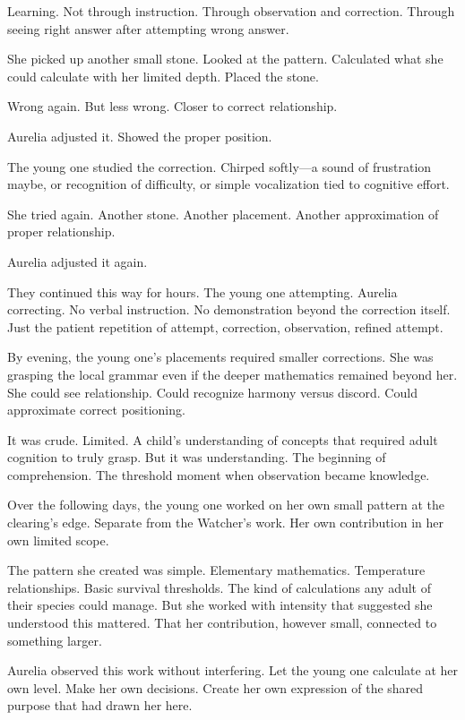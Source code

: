 Learning. Not through instruction. Through observation and correction. Through seeing right answer after attempting wrong answer.

She picked up another small stone. Looked at the pattern. Calculated what she could calculate with her limited depth. Placed the stone.

Wrong again. But less wrong. Closer to correct relationship.

Aurelia adjusted it. Showed the proper position.

The young one studied the correction. Chirped softly—a sound of frustration maybe, or recognition of difficulty, or simple vocalization tied to cognitive effort.

She tried again. Another stone. Another placement. Another approximation of proper relationship.

Aurelia adjusted it again.

They continued this way for hours. The young one attempting. Aurelia correcting. No verbal instruction. No demonstration beyond the correction itself. Just the patient repetition of attempt, correction, observation, refined attempt.

By evening, the young one's placements required smaller corrections. She was grasping the local grammar even if the deeper mathematics remained beyond her. She could see relationship. Could recognize harmony versus discord. Could approximate correct positioning.

It was crude. Limited. A child's understanding of concepts that required adult cognition to truly grasp. But it was understanding. The beginning of comprehension. The threshold moment when observation became knowledge.

\scenebreak

Over the following days, the young one worked on her own small pattern at the clearing's edge. Separate from the Watcher's work. Her own contribution in her own limited scope.

The pattern she created was simple. Elementary mathematics. Temperature relationships. Basic survival thresholds. The kind of calculations any adult of their species could manage. But she worked with intensity that suggested she understood this mattered. That her contribution, however small, connected to something larger.

Aurelia observed this work without interfering. Let the young one calculate at her own level. Make her own decisions. Create her own expression of the shared purpose that had drawn her here.

